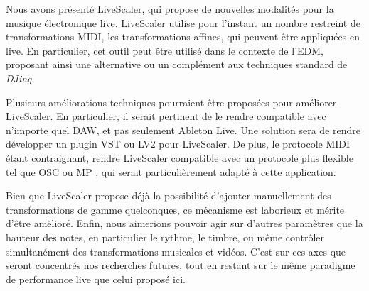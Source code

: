 Nous avons présenté LiveScaler, qui propose de nouvelles modalités pour la musique électronique live. Live\-Scaler utilise pour l'instant un nombre restreint de transformations MIDI, les transformations affines, qui peuvent être appliquées en live. En particulier, cet outil peut être utilisé dans le contexte de l'EDM, proposant ainsi une alternative ou un complément aux techniques standard de \emph{DJing}.

Plusieurs améliorations techniques pourraient être proposées pour améliorer LiveScaler. En particulier, il serait pertinent de le rendre compatible avec n'importe quel DAW, et pas seulement Ableton Live. Une solution sera de rendre développer un plugin VST ou LV2 pour LiveScaler. De plus, le protocole MIDI étant contraignant, rendre LiveScaler compatible avec un protocole plus flexible tel que OSC \cite{wright2005open} ou MP \cite{goudard2017mapping}, qui serait particulièrement adapté à cette application.

Bien que LiveScaler propose déjà la possibilité d'ajouter manuellement des transformations de gamme quelconques, ce mécanisme est laborieux et mérite d'être amélioré. Enfin, nous aimerions pouvoir agir sur d'autres paramètres que la hauteur des notes, en particulier le rythme, le timbre, ou même contrôler simultanément des transformations musicales et vidéos. C'est sur ces axes que seront concentrés nos recherches futures, tout en restant sur le même paradigme de performance live que celui proposé ici.

